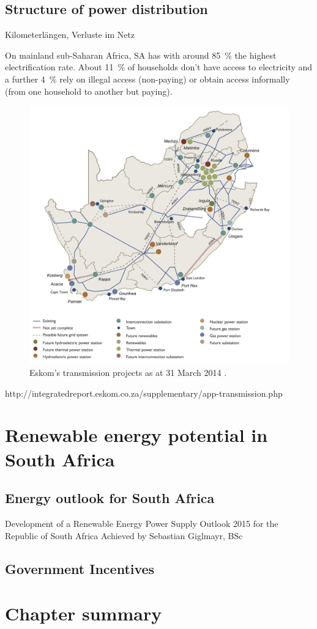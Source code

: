 \subsection{Structure of power distribution}
Kilometerlängen, Verluste im Netz \cite{Eskom2014a}

On mainland sub-Saharan Africa, SA has with around 85~\% the highest electrification rate. About 11~\% of households don't have access to electricity and a further 4~\% rely on illegal access (non-paying) or obtain access informally (from one household to another but paying). \cite{IEA2014f}

\begin{figure}[htbp] %
\centering
\includegraphics[width=0.9\linewidth]{FIG/transmissionprojekts}
\caption[Eskom’s transmission projects as at 31 March 2014.]{Eskom’s transmission projects as at 31 March 2014 \cite{Eskom2014}.}\label{Abb1}
\end{figure}

http://integratedreport.eskom.co.za/supplementary/app-transmission.php

\section{Renewable energy potential in South Africa}

\subsection{Energy outlook for South Africa}
Development of a Renewable Energy Power Supply Outlook 2015 for the Republic of South Africa
Achieved by Sebastian Giglmayr, BSc
\cite{Giglmayr2013}

\subsection{Government Incentives}

\section{Chapter summary}
\pagebreak

